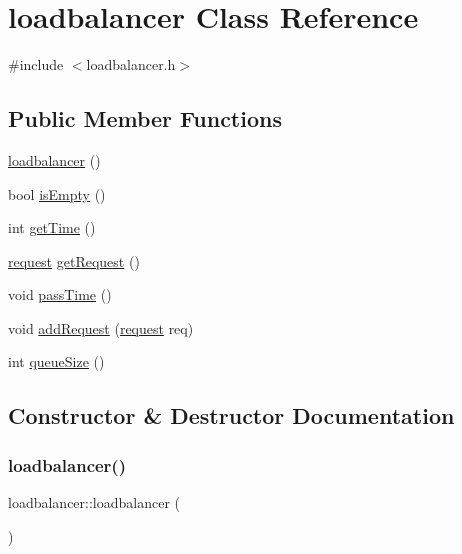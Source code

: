 \hypertarget{classloadbalancer}{}\section{loadbalancer Class Reference}
\label{classloadbalancer}


{\ttfamily \#include $<$loadbalancer.\+h$>$}

\subsection*{Public Member Functions}
\begin{DoxyCompactItemize}
\item 
\hyperlink{classloadbalancer_ad453fd2fc0c910f82ef31c18353fc774}{loadbalancer} ()
\item 
bool \hyperlink{classloadbalancer_a542b0b5b5759c074e3e8d1cbf1f33b52}{is\+Empty} ()
\item 
int \hyperlink{classloadbalancer_afc308893c7ab0fc8b92036deae7a2de9}{get\+Time} ()
\item 
\hyperlink{structrequest}{request} \hyperlink{classloadbalancer_a3d1715e4b2218a7aa9ad74e3e4fa6167}{get\+Request} ()
\item 
void \hyperlink{classloadbalancer_a4d793bdf97c72b577ada58a774c3bddb}{pass\+Time} ()
\item 
void \hyperlink{classloadbalancer_a2c45d009dffc50f5d5d3a6c2b295311d}{add\+Request} (\hyperlink{structrequest}{request} req)
\item 
int \hyperlink{classloadbalancer_a9716bb001708f3c7792df0d1c8689ab0}{queue\+Size} ()
\end{DoxyCompactItemize}


\subsection{Constructor \& Destructor Documentation}
\mbox{\label{classloadbalancer_ad453fd2fc0c910f82ef31c18353fc774}} 
\subsubsection{\texorpdfstring{loadbalancer()}{loadbalancer()}}
{\footnotesize\ttfamily loadbalancer\+::loadbalancer (\begin{DoxyParamCaption}{ }\end{DoxyParamCaption})}


